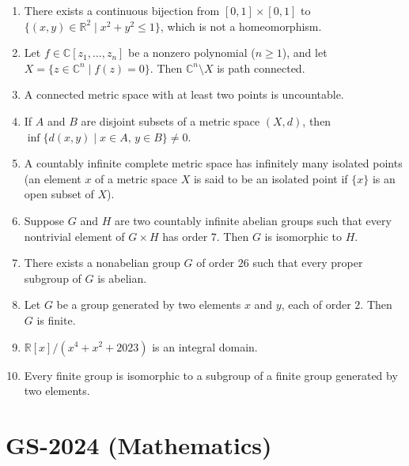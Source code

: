 \documentclass[11pt, a4paper]{article}
\begin{document}
\begin{enumerate}
  \item There exists a continuous bijection from $[0,1] \times [0,1]$ to $\{(x, y) \in \mathbb{R}^2 \mid x^2 + y^2 \le 1\}$, which is not a homeomorphism.
  \item Let $f \in \mathbb{C}[z_1, \dots, z_n]$ be a nonzero polynomial ($n \ge 1$), and let $X = \{z \in \mathbb{C}^n \mid f(z) = 0\}$. Then $\mathbb{C}^n \setminus X$ is path connected.
  \item A connected metric space with at least two points is uncountable.
  \item If $A$ and $B$ are disjoint subsets of a metric space $(X, d)$, then $\inf\{d(x, y) \mid x \in A, \, y \in B\} \ne 0$.
  \item A countably infinite complete metric space has infinitely many isolated points (an element $x$ of a metric space $X$ is said to be an isolated point if $\{x\}$ is an open subset of $X$).
  \item Suppose $G$ and $H$ are two countably infinite abelian groups such that every nontrivial element of $G \times H$ has order $7$. Then $G$ is isomorphic to $H$.
  \item There exists a nonabelian group $G$ of order $26$ such that every proper subgroup of $G$ is abelian.
  \item Let $G$ be a group generated by two elements $x$ and $y$, each of order $2$. Then $G$ is finite.
  \item $\mathbb{R}[x]/(x^4 + x^2 + 2023)$ is an integral domain.
  \item Every finite group is isomorphic to a subgroup of a finite group generated by two elements.
\end{enumerate}

\newpage

\section{GS-2024 (Mathematics)}
\end{document}
